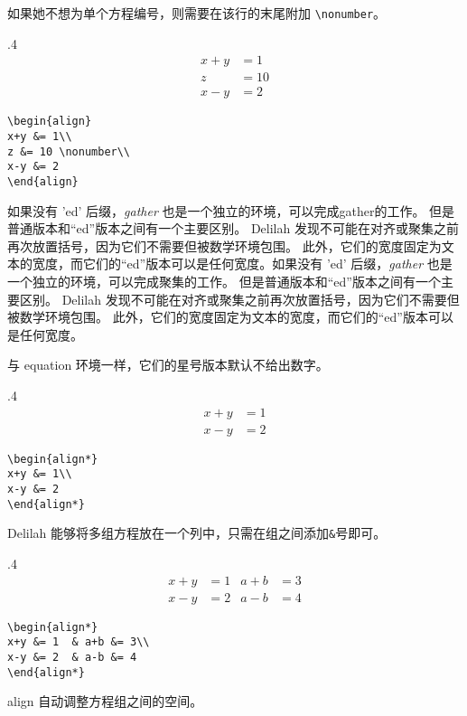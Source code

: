 如果她不想为单个方程编号，则需要在该行的末尾附加 \verb=\nonumber=。
\begin{miniexammar}{.4\textandmarginlen}{
\begin{align}
x+y &= 1\\
z&=10 \nonumber\\
x-y &= 2
\end{align}
}
\begin{lstlisting}
\begin{align}
x+y &= 1\\
z &= 10 \nonumber\\
x-y &= 2
\end{align}
\end{lstlisting}
\end{miniexammar}

如果没有 'ed' 后缀，\emph{gather} 也是一个独立的环境，可以完成gather的工作。 但是普通版本和“ed”版本之间有一个主要区别。 Delilah 发现不可能在对齐或聚集之前再次放置括号，因为它们不需要但被数学环境包围。 此外，它们的宽度固定为文本的宽度，而它们的“ed”版本可以是任何宽度。如果没有 'ed' 后缀，\emph{gather} 也是一个独立的环境，可以完成聚集的工作。 但是普通版本和“ed”版本之间有一个主要区别。 Delilah 发现不可能在对齐或聚集之前再次放置括号，因为它们不需要但被数学环境包围。 此外，它们的宽度固定为文本的宽度，而它们的“ed”版本可以是任何宽度。

与 equation 环境一样，它们的星号版本默认不给出数字。
\begin{miniexammar}{.4\textandmarginlen}{
\begin{align*}
x+y &= 1\\
x-y &= 2
\end{align*}
}
\begin{lstlisting}
\begin{align*}
x+y &= 1\\
x-y &= 2
\end{align*}
\end{lstlisting}
\end{miniexammar}

Delilah 能够将多组方程放在一个列中，只需在组之间添加\verb=&=号即可。
\begin{miniexammar}{.4\textandmarginlen}{
\begin{align*}
x+y &= 1  & a+b &= 3\\
x-y &= 2  & a-b &= 4
\end{align*}
}
\begin{lstlisting}
\begin{align*}
x+y &= 1  & a+b &= 3\\
x-y &= 2  & a-b &= 4
\end{align*}
\end{lstlisting}
\end{miniexammar}
align 自动调整方程组之间的空间。

